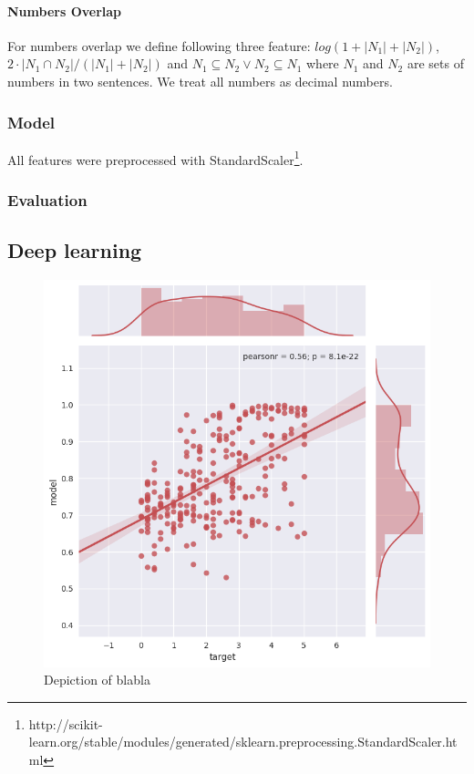 \documentclass[10pt, a4paper]{article}
\begin{document}
\paragraph{Numbers Overlap \\}
For numbers overlap we define following three feature: $log(1+|N_1|+|N_2|)$, $2\cdot|N_1 \cap N_2|/(|N_1|+|N_2|)$ and $N_1 \subseteq N_2 \vee N_2 \subseteq N_1$
where $N_1$ and $N_2$ are sets of numbers in two sentences. We treat all numbers as decimal numbers.

\subsubsection{Model}
All features were preprocessed with StandardScaler\footnote{http://scikit-learn.org/stable/modules/generated/sklearn.preprocessing.StandardScaler.html}. 
\subsubsection{Evaluation}

\subsection{Deep learning}


\newpage
\begin{figure}
\begin{center}
\includegraphics[width=\columnwidth]{only_2nd_layer.png}
\caption{Depiction of blabla}
\label{fig:lstm_2nd_layer}
\end{center}
\end{figure}
\end{document}
